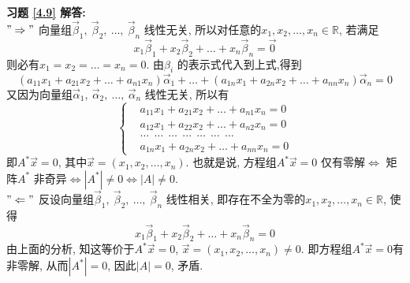 \textbf{习题 \ref{4.9} 解答:}\\
$"\Rightarrow"$ 向量组$\vec{\beta}_1,\ \vec{\beta}_2,\ \dots,\ \vec{\beta}_n$ 线性无关, 所以对任意的$x_1,x_2,\dots,x_n\in \mathbb{R}$, 若满足
$$x_1\vec{\beta}_1+x_2\vec{\beta}_2+\dots+x_n\vec{\beta}_n=\vec{0}$$
则必有$x_1=x_2=\dots=x_n=0$. 由$\beta_i$ 的表示式代入到上式,得到
$$(a_{11}x_1+a_{21}x_2+\dots+a_{n1}x_n)\vec{\alpha}_1+\dots+(a_{1n}x_1+a_{2n}x_2+\dots+a_{nn}x_n)\vec{\alpha}_n=0$$
又因为向量组$\vec{\alpha}_1, \ \vec{\alpha}_2, \ \dots,\ \vec{\alpha}_n$ 线性无关, 所以有
\begin{displaymath}
\left\{\begin{aligned}
&a_{11}x_1+a_{21}x_2+\dots+a_{n1}x_n=0\\
&a_{12}x_1+a_{22}x_2+\dots+a_{n2}x_n=0\\
&\dots\ \ \dots\ \ \dots\ \ \dots\ \ \dots \ \ \dots \ \ \dots\\
&a_{1n}x_1+a_{2n}x_2+\dots+a_{nn}x_n=0
\end{aligned}
\right.
\end{displaymath}
即$A^{*}\vec{x}=0$, 其中$\vec{x}=(x_1,x_2,\dots,x_n)$. 也就是说, 方程组$A^{*}\vec{x}=0$ 仅有零解$\Leftrightarrow$ 矩阵$A^{*}$ 非奇异$\Leftrightarrow|A^{*}|\not=0\Leftrightarrow |A|\not=0$.\\
$"\Leftarrow"$ 反设向量组$\vec{\beta}_1,\ \vec{\beta}_2,\ \dots,\ \vec{\beta}_n$ 线性相关, 即存在不全为零的$x_1,x_2,\dots,x_n\in \mathbb{R}$, 使得
$$x_1\vec{\beta}_1+x_2\vec{\beta}_2+\dots+x_n\vec{\beta}_n=0$$
由上面的分析, 知这等价于$A^{*}\vec{x}=0$,  $\vec{x}=(x_1,x_2,\dots,x_n)\not=0$. 即方程组$A^{*}\vec{x}=0$有非零解, 从而$|A^{*}|=0$, 因此$|A|=0$, 矛盾.

